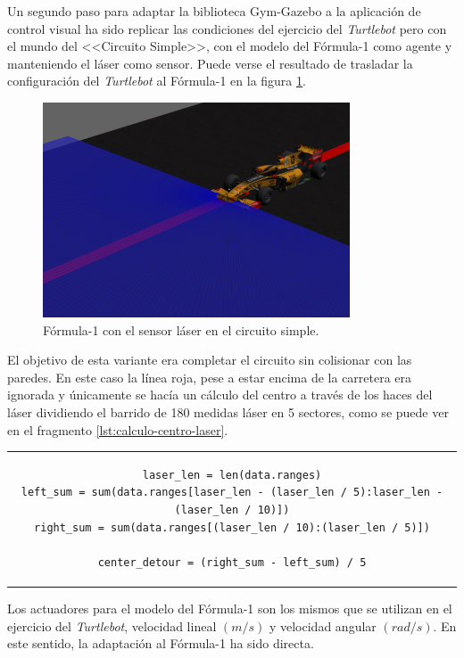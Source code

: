 Un segundo paso para adaptar la biblioteca Gym-Gazebo a la aplicación de control visual ha sido replicar las condiciones del ejercicio del \textit{Turtlebot} pero con el mundo del <<Circuito Simple>>, con el modelo del Fórmula-1 como agente y manteniendo el láser como sensor. Puede verse el resultado de trasladar la configuración del \textit{Turtlebot} al Fórmula-1 en la figura \ref{fig:f1-laser}.

\begin{figure}[!ht]
    \centering \includegraphics[width=0.5\columnwidth]{./figures/chapter_4/model_f1_laser.png}
    \caption{Fórmula-1 con el sensor láser en el circuito simple.\label{fig:f1-laser}}
\end{figure}

El objetivo de esta variante era completar el circuito sin colisionar con las paredes. En este caso la línea roja, pese a estar encima de la carretera era ignorada y únicamente se hacía un cálculo del centro a través de los haces del láser dividiendo el barrido de 180 medidas láser en 5 sectores, como se puede ver en el fragmento \ref{lst:calculo-centro-laser}.

\vspace{5mm}

\begin{tabular}{c}
\begin{lstlisting}[basicstyle=\ttfamily\scriptsize, caption={Cálculo del centro del carril usando el láser.}, captionpos=b, numbers=none, label={lst:calculo-centro-laser}, style=Python]
laser_len = len(data.ranges)
left_sum = sum(data.ranges[laser_len - (laser_len / 5):laser_len - (laser_len / 10)])
right_sum = sum(data.ranges[(laser_len / 10):(laser_len / 5)])

center_detour = (right_sum - left_sum) / 5
\end{lstlisting}
\end{tabular}

\vspace{5mm}

Los actuadores para el modelo del Fórmula-1 son los mismos que se utilizan en el ejercicio del \textit{Turtlebot}, velocidad lineal $(m/s)$ y velocidad angular $(rad/s)$. En este sentido, la adaptación al Fórmula-1 ha sido directa.

